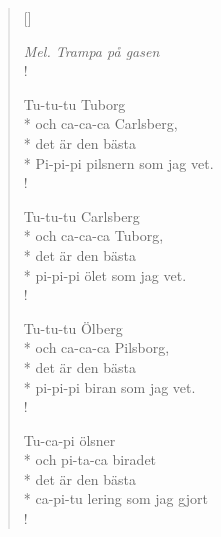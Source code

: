 
\settowidth{\versewidth}{Pi-pi-pi pilsnern som jag vet.}



\begin{verse}[\versewidth]

\flagverse{}
\emph{Mel. Trampa på gasen}\\!

Tu-tu-tu Tuborg\\*
och ca-ca-ca Carlsberg,\\*
det är den bästa\\*
Pi-pi-pi pilsnern som jag vet.\\!


Tu-tu-tu Carlsberg\\*
och ca-ca-ca Tuborg,\\*
det är den bästa\\*
pi-pi-pi ölet som jag vet.\\!


Tu-tu-tu Ölberg\\*
och ca-ca-ca Pilsborg,\\*
det är den bästa\\*
pi-pi-pi biran som jag vet.\\!


Tu-ca-pi ölsner\\*
och pi-ta-ca biradet\\*
det är den bästa\\*
ca-pi-tu lering som jag gjort\\!


\end{verse}


